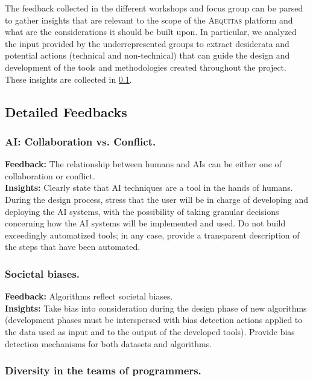 \documentclass[12pt,a4paper,openright,twoside]{book}
\newcommand{\aequitas}{\textsc{Aequitas}}
\begin{document}
The feedback collected in the different workshops and focus group can be parsed to gather insights that are relevant to the scope of the \aequitas{} platform and what are the considerations it should be built upon.
%
In particular, we analyzed the input provided by the underrepresented groups to extract desiderata and potential actions (technical and non-technical) that can guide the design and development of the tools and methodologies created throughout the project.
%
These insights are collected in \cref{sec:detailed-feedbacks}.


\subsection{Detailed Feedbacks}\label{sec:detailed-feedbacks}

\subsubsection{\ac{AI}: Collaboration vs. Conflict.}

\textbf{Feedback:} The relationship between humans and AIs can be either one of collaboration or conflict.
\\
\textbf{Insights:} Clearly state that AI techniques are a tool in the hands of humans.
%
During the design process, stress that the user will be in charge of developing and deploying the AI systems, with the possibility of taking granular decisions concerning how the AI systems will be implemented and used.
%
Do not build exceedingly automatized tools; in any case, provide a transparent description of the steps that have been automated.

\subsubsection{Societal biases.}

\textbf{Feedback:} Algorithms reflect societal biases.
\\
\textbf{Insights:} Take bias into consideration during the design phase of new algorithms (development phases must be interspersed with bias detection actions applied to the data used as input and to the output of the developed tools).
%
Provide bias detection mechanisms for both datasets and algorithms.

\subsubsection{Diversity in the teams of programmers.}
\end{document}
